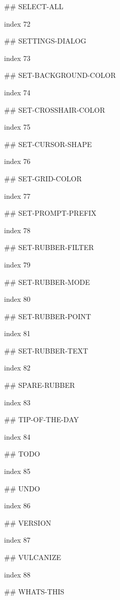 ## SELECT-ALL

index 72



## SETTINGS-DIALOG

index 73



## SET-BACKGROUND-COLOR

index 74



## SET-CROSSHAIR-COLOR

index 75



## SET-CURSOR-SHAPE

index 76



## SET-GRID-COLOR

index 77



## SET-PROMPT-PREFIX

index 78



## SET-RUBBER-FILTER

index 79



## SET-RUBBER-MODE

index 80



## SET-RUBBER-POINT

index 81



## SET-RUBBER-TEXT

index 82



## SPARE-RUBBER

index 83



## TIP-OF-THE-DAY

index 84



## TODO

 index 85



## UNDO

 index 86



## VERSION

index 87



## VULCANIZE

index 88



## WHATS-THIS

